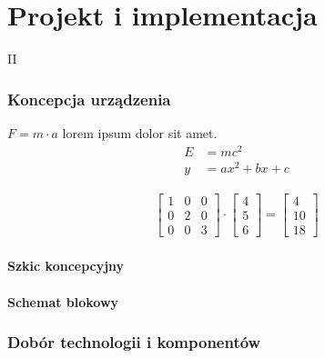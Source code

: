 \part{Projekt i implementacja}{II}
\noindent \lipsum[1-3]

\clearpage\section{Koncepcja urządzenia}
    \noindent \lipsum[1-3] $F = m \cdot a$ lorem ipsum dolor sit amet.
    \begin{align}
        E & = mc^2 \\
        y & = ax^2 + bx + c
    \end{align}

    \lipsum[4-5]
    \begin{align}
        \begin{bmatrix}
            1 & 0 & 0 \\
            0 & 2 & 0 \\
            0 & 0 & 3
        \end{bmatrix} \cdot
        \begin{bmatrix}
            4 \\
            5 \\
            6
        \end{bmatrix} =
        \begin{bmatrix}
            4  \\
            10 \\
            18
        \end{bmatrix}
    \end{align}


    \subsection{Szkic koncepcyjny}
        \noindent \lipsum[6-7]

    \subsection{Schemat blokowy}
        \noindent \lipsum[8-9]

\clearpage\section{Dobór technologii i komponentów} 
    \noindent \lipsum[1-3]

